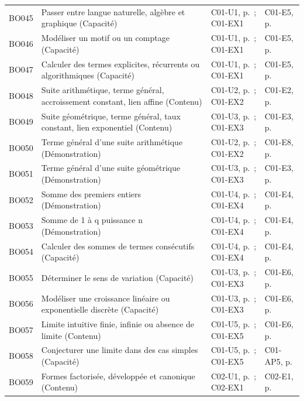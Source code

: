 \begin{longtable}{p{.1\linewidth}p{.43\linewidth}p{.19\linewidth}p{.16\linewidth}}
BO045 & Passer entre langue naturelle, algèbre et graphique (Capacité) & C01-U1, p.\,\pageref{C01-U1} ; C01-EX1 & C01-E5, p.\,\pageref{C01-E5} \\
BO046 & Modéliser un motif ou un comptage (Capacité) & C01-U1, p.\,\pageref{C01-U1} ; C01-EX1 & C01-E5, p.\,\pageref{C01-E5} \\
BO047 & Calculer des termes explicites, récurrents ou algorithmiques (Capacité) & C01-U1, p.\,\pageref{C01-U1} ; C01-EX1 & C01-E5, p.\,\pageref{C01-E5} \\
BO048 & Suite arithmétique, terme général, accroissement constant, lien affine (Contenu) & C01-U2, p.\,\pageref{C01-U2} ; C01-EX2 & C01-E2, p.\,\pageref{C01-E2} \\
BO049 & Suite géométrique, terme général, taux constant, lien exponentiel (Contenu) & C01-U3, p.\,\pageref{C01-U3} ; C01-EX3 & C01-E3, p.\,\pageref{C01-E3} \\
BO050 & Terme général d’une suite arithmétique (Démonstration) & C01-U2, p.\,\pageref{C01-U2} ; C01-EX2 & C01-E8, p.\,\pageref{C01-E8} \\
BO051 & Terme général d’une suite géométrique (Démonstration) & C01-U3, p.\,\pageref{C01-U3} ; C01-EX3 & C01-E3, p.\,\pageref{C01-E3} \\
BO052 & Somme des premiers entiers (Démonstration) & C01-U4, p.\,\pageref{C01-U4} ; C01-EX4 & C01-E4, p.\,\pageref{C01-E4} \\
BO053 & Somme de 1 à q puissance n (Démonstration) & C01-U4, p.\,\pageref{C01-U4} ; C01-EX4 & C01-E4, p.\,\pageref{C01-E4} \\
BO054 & Calculer des sommes de termes consécutifs (Capacité) & C01-U4, p.\,\pageref{C01-U4} ; C01-EX4 & C01-E4, p.\,\pageref{C01-E4} \\
BO055 & Déterminer le sens de variation (Capacité) & C01-U3, p.\,\pageref{C01-U3} ; C01-EX3 & C01-E6, p.\,\pageref{C01-E6} \\
BO056 & Modéliser une croissance linéaire ou exponentielle discrète (Capacité) & C01-U3, p.\,\pageref{C01-U3} ; C01-EX3 & C01-E6, p.\,\pageref{C01-E6} \\
BO057 & Limite intuitive finie, infinie ou absence de limite (Contenu) & C01-U5, p.\,\pageref{C01-U5} ; C01-EX5 & C01-E6, p.\,\pageref{C01-E6} \\
BO058 & Conjecturer une limite dans des cas simples (Capacité) & C01-U5, p.\,\pageref{C01-U5} ; C01-EX5 & C01-AP5, p.\,\pageref{C01-AP5} \\
BO059 & Formes factorisée, développée et canonique (Contenu) & C02-U1, p.\,\pageref{C02-U1} ; C02-EX1 & C02-E1, p.\,\pageref{C02-E1} \\

\end{longtable}

